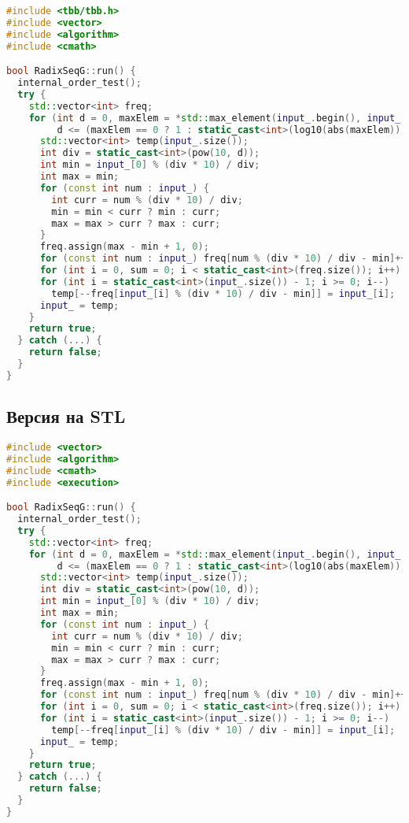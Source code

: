 \documentclass[]{article}
\theoremstyle{remark}
\theoremstyle{definition}
\begin{document}
\begin{lstlisting}[language=C++]
#include <tbb/tbb.h>
#include <vector>
#include <algorithm>
#include <cmath>

bool RadixSeqG::run() {
  internal_order_test();
  try {
    std::vector<int> freq;
    for (int d = 0, maxElem = *std::max_element(input_.begin(), input_.end());
         d <= (maxElem == 0 ? 1 : static_cast<int>(log10(abs(maxElem))) + 1); d++) {
      std::vector<int> temp(input_.size());
      int div = static_cast<int>(pow(10, d));
      int min = input_[0] % (div * 10) / div;
      int max = min;
      for (const int num : input_) {
        int curr = num % (div * 10) / div;
        min = min < curr ? min : curr;
        max = max > curr ? max : curr;
      }
      freq.assign(max - min + 1, 0);
      for (const int num : input_) freq[num % (div * 10) / div - min]++;
      for (int i = 0, sum = 0; i < static_cast<int>(freq.size()); i++) sum += freq[i], freq[i] = sum;
      for (int i = static_cast<int>(input_.size()) - 1; i >= 0; i--)
        temp[--freq[input_[i] % (div * 10) / div - min]] = input_[i];
      input_ = temp;
    }
    return true;
  } catch (...) {
    return false;
  }
}
\end{lstlisting}

\subsection{Версия на STL}

\begin{lstlisting}[language=C++]
#include <vector>
#include <algorithm>
#include <cmath>
#include <execution>

bool RadixSeqG::run() {
  internal_order_test();
  try {
    std::vector<int> freq;
    for (int d = 0, maxElem = *std::max_element(input_.begin(), input_.end());
         d <= (maxElem == 0 ? 1 : static_cast<int>(log10(abs(maxElem))) + 1); d++) {
      std::vector<int> temp(input_.size());
      int div = static_cast<int>(pow(10, d));
      int min = input_[0] % (div * 10) / div;
      int max = min;
      for (const int num : input_) {
        int curr = num % (div * 10) / div;
        min = min < curr ? min : curr;
        max = max > curr ? max : curr;
      }
      freq.assign(max - min + 1, 0);
      for (const int num : input_) freq[num % (div * 10) / div - min]++;
      for (int i = 0, sum = 0; i < static_cast<int>(freq.size()); i++) sum += freq[i], freq[i] = sum;
      for (int i = static_cast<int>(input_.size()) - 1; i >= 0; i--)
        temp[--freq[input_[i] % (div * 10) / div - min]] = input_[i];
      input_ = temp;
    }
    return true;
  } catch (...) {
    return false;
  }
}

\end{lstlisting}
\end{document}
